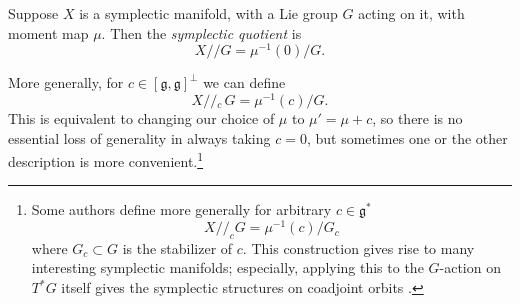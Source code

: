 \documentclass[12pt,letterpaper,reqno]{article}
\numberwithin{equation}{section}
\newcommand{\fg}{{\mathfrak g}}
\newcommand{\kq}{/\!\!/}
\newcommand{\kql}[1]{/\!\!/\!\!_#1\,}
\newcommand{\ti}[1]{\textit{#1}}
\begin{document}
\begin{defn} \label{def:symplectic-quotient} \cite{MR0402819}
Suppose $X$ is a symplectic manifold, with a Lie group $G$
acting on it, with moment map $\mu$. Then the \ti{symplectic quotient}
is
\begin{equation}
  X \kq G = \mu^{-1}(0) / G.
\end{equation}
\end{defn}

More generally, for $c \in [\fg,\fg]^\perp$ we can define
\begin{equation}
  X \kql{c} G = \mu^{-1}(c) / G.
\end{equation}
This is equivalent to changing our choice of $\mu$ to $\mu' = \mu+c$,
so there is no essential loss of generality in always taking $c = 0$,
but sometimes one or the other description is more convenient.\footnote{Some authors define more generally for arbitrary
$c \in \fg^*$
\begin{equation}
  X \kq_c G = \mu^{-1}(c) / G_c
\end{equation}
where $G_c \subset G$ is the stabilizer of $c$. This construction
gives rise to many interesting symplectic manifolds; especially,
applying this to the $G$-action on $T^* G$ itself gives the
symplectic structures on coadjoint orbits \cite{MR0402819}.}
\end{document}

